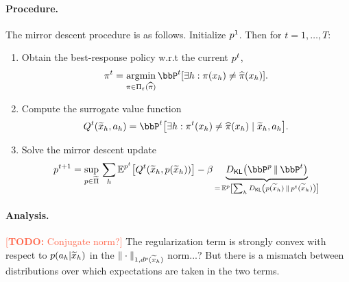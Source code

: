 \documentclass{article}
\newcommand{\todo}[1]{\textcolor{Tomato}{[\textbf{TODO:} {#1}]}}
\let\oldparagraph\paragraph
\renewcommand{\paragraph}[1]{\oldparagraph{#1.}}
\begin{document}
\paragraph{Procedure} 
The mirror descent procedure is as follows. 
Initialize $p^{1}$. Then for $t = 1,\ldots,T$: 
\begin{enumerate}
  \item Obtain the best-response policy w.r.t the current $p^{t}$,
  \begin{align*}
    \pi\ind{t} = \argmin_{\pi\in\Pi_\veps(\pihat)}{}\bbP\ind{t}\sbr*{\exists h : \pi(x_h) \neq \pihat(x_h)}.
  \end{align*}
  \item Compute the surrogate value function 
  \begin{align*}
    Q\ind{t}(\wt{x}_h, a_h) 
    = 
    \bbP\ind{t}\sbr*{\exists h : \pi\ind{t}(x_h) \neq \pihat(x_h)\mid{}\wt{x}_h,a_h}.
  \end{align*}
  \item Solve the mirror descent update 
  \begin{align*}
    p\ind{t+1} 
    = 
    \sup_{p\in\wt\Pi}{} \sum_h \En^{p\ind{t}}\sbr*{Q\ind{t}(\wt{x}_h,p(\wt{x}_h))}
    - \beta \underbrace{\Dkl{\bbP^p}{\bbP\ind{t}}}_{={} \En^p\sbr*{\sum_h \Dkl{p(\wt{x}_h)}{p\ind{t}(\wt{x}_h)}}}
  \end{align*}
\end{enumerate}

\paragraph{Analysis} 
\todo{Conjugate norm?}
The regularization term is strongly convex with respect to $p(a_h|\widetilde{x}_h)$ in the $\|\cdot\|_{1,d^p(\widetilde{x}_h)}$ norm...? But there is a mismatch between distributions over which expectations are taken in the two terms. 




\newpage 




% 
\end{document}
